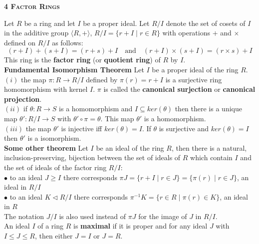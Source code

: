 \documentclass[a4paper]{article}
\begin{document}
\begin{framed}
	\begin{center}
		\textbf{\textsc{4 Factor Rings}}
	\end{center}
	Let $R$ be a ring and let $I$ be a proper ideal. Let $R/I$ denote the set of cosets of $I$ in the additive group $\langle R, + \rangle$, $R/I = \{r + I \; \vert \; r \in R\}$ with operations $+$ and $\times$ defined on $R/I$ as follows:
	$$(r + I) + (s + I) = (r + s) + I \quad \text{and} \quad (r + I) \times (s + I) = (r \times s) + I$$
	This ring is the \textbf{factor ring} (or \textbf{quotient ring}) of $R$ by $I$.\\
	
	\noindent
	\textbf{Fundamental Isomorphism Theorem} Let $I$ be a proper ideal of the ring $R$.\\
	$(i)$ the map $\pi : R \rightarrow R/I$ defined by $\pi(r) = r + I$ is a surjective ring homomorphism with kernel $I$. $\pi$ is called the \textbf{canonical surjection} or \textbf{canonical projection}.\\
	$(ii)$ if $\theta : R \rightarrow S$ is a homomorphism and $I \subseteq ker(\theta)$ then there is a unique map $\theta' : R/I \rightarrow S$ with $\theta' \circ \pi = \theta$. This map $\theta'$ is a homomorphism.\\
	$(iii)$ the map $\theta'$ is injective iff $ker(\theta) = I$. If $\theta$ is surjective and $ker(\theta) = I$ then $\theta'$ is a isomorphism.\\
	
	\noindent
	\textbf{Some other theorem} Let $I$ be an ideal of the ring $R$, then there is a natural, inclusion-preserving, bijection between the set of ideals of $R$ which contain $I$ and the set of ideals of the factor ring $R/I$:\\
	$\bullet$ to an ideal $J \geq I$ there corresponds $\pi J = \{r + I \; \vert \; r \in J\} = \{\pi(r) \; \vert \; r \in J\}$, an ideal in $R/I$\\
	$\bullet$ to an ideal $K \triangleleft R/I$ there corresponds $\pi^{-1}K = \{r \in R \; \vert \; \pi(r) \in K\}$, an ideal in $R$\\
	The notation $J/I$ is also used instead of $\pi J$ for the image of $J$ in $R/I$.\\
	
	\noindent
	An ideal $I$ of a ring $R$ is \textbf{maximal} if it is proper and for any ideal $J$ with $I \leq J \leq R$, then either $J = I$ or $J = R$.\\
	

\end{framed}
\end{document}
